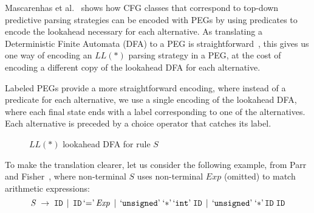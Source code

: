\documentclass[3p,12pt,singlecolumn]{elsarticle}
\begin{document}
Mascarenhas et al.~\cite{mascarenhas2014} shows how
CFG classes that correspond to top-down predictive parsing
strategies can be encoded with PEGs by using predicates to
encode the lookahead necessary for each alternative.
As translating a Deterministic Finite Automata (DFA) to a
PEG is straightforward~\cite{ierusalimschy2009lpeg,mascarenhas2014},
this gives us one way of encoding an $LL(*)$ parsing strategy in
a PEG, at the cost of encoding a different copy of the
lookahead DFA for each alternative.

Labeled PEGs provide a more straightforward encoding,
where instead of a predicate for each alternative, 
we use a single encoding of the lookahead DFA, where each
final state ends with a label corresponding to one
of the alternatives. Each alternative is preceded by
a choice operator that catches its label.

\begin{figure}[t]
\begin{center}
\end{center}
\caption{$LL(*)$ lookahead DFA for rule $S$}
\label{fig:antlrdfa}
\end{figure}

To make the translation clearer, let us consider the following
example, from Parr and Fisher~\cite{parr2011llstar},
where non-terminal $S$ uses non-terminal $Exp$ (omitted) to match
arithmetic expressions:
\[
\it{S} \;\rightarrow\; {\tt ID} \;\,|\,\; \tt{ID} \,`{\tt =}\textrm'\, {\it Exp} \;\,|\;\,
                   `{\tt unsigned}\textrm' \; `\tt{*}\textrm' \, `{\tt int}\textrm'\; {\tt ID} \;\,|\;\,
                   `{\tt unsigned}\textrm' \;`\tt{*}\textrm'\, {\tt ID}\; {\tt ID}
\]
\end{document}
